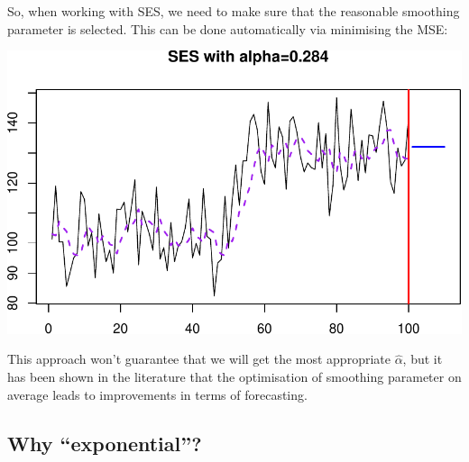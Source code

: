 \documentclass[
]{book}
\newenvironment{Shaded}{\begin{snugshade}}{\end{snugshade}}
\newcommand{\AttributeTok}[1]{\textcolor[rgb]{0.77,0.63,0.00}{#1}}
\newcommand{\DecValTok}[1]{\textcolor[rgb]{0.00,0.00,0.81}{#1}}
\newcommand{\FunctionTok}[1]{\textcolor[rgb]{0.00,0.00,0.00}{#1}}
\newcommand{\NormalTok}[1]{#1}
\newcommand{\OtherTok}[1]{\textcolor[rgb]{0.56,0.35,0.01}{#1}}
\newcommand{\SpecialCharTok}[1]{\textcolor[rgb]{0.00,0.00,0.00}{#1}}
\newcommand{\StringTok}[1]{\textcolor[rgb]{0.31,0.60,0.02}{#1}}
\theoremstyle{definition}
\theoremstyle{definition}
\theoremstyle{definition}
\theoremstyle{definition}
\theoremstyle{remark}
\begin{document}
So, when working with SES, we need to make sure that the reasonable smoothing parameter is selected. This can be done automatically via minimising the MSE:

\begin{Shaded}
\end{Shaded}

\includegraphics{adam_files/figure-latex/SESExample3-1.pdf}

This approach won't guarantee that we will get the most appropriate \(\hat{\alpha}\), but it has been shown in the literature that the optimisation of smoothing parameter on average leads to improvements in terms of forecasting.

\hypertarget{whyExponential}{%
\subsection{Why ``exponential''?}\label{whyExponential}}
\end{document}
